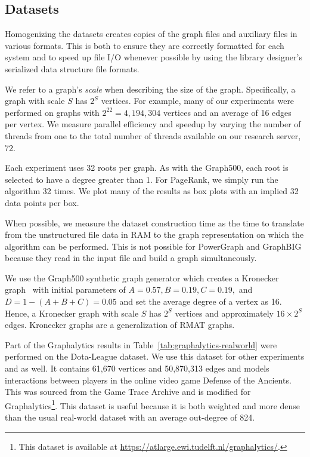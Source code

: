 \documentclass[conference]{IEEEtran}
\begin{document}
\subsection{Datasets}
Homogenizing the datasets creates copies of the graph files and auxiliary files in various formats. This is both to ensure they are correctly formatted for each system and to speed up file I/O whenever possible by using the library designer's serialized data structure file formats.

We refer to a graph's \emph{scale} when describing the size of the graph. Specifically, a graph with scale $S$ has $2^S$ vertices. For example, many of our experiments were performed on graphs with $2^{22} = 4,194,304$ vertices and an average of 16 edges per vertex. We measure parallel efficiency and speedup by varying the number of threads from one to the total number of threads available on our research server, 72.

Each experiment uses 32 roots per graph. As with the Graph500, each root is selected to have a degree greater than 1. For PageRank, we simply run the algorithm 32 times. We plot many of the results as box plots with an implied 32 data points per box.

When possible, we measure the dataset construction time as the time to translate from the unstructured file data in RAM to the graph representation on which the algorithm can be performed. This is not possible for PowerGraph and GraphBIG because they read in the input file and build a graph simultaneously.

We use the Graph500 synthetic graph generator which creates a Kronecker graph~\cite{Leskovec:2010:Kronecker} with initial parameters of $A = 0.57, B = 0.19, C = 0.19,$ and $D = 1-(A+B+C) = 0.05$ and set the average degree of a vertex as 16. Hence, a Kronecker graph with scale $S$ has $2^S$ vertices and approximately $16 \times 2^S$ edges. Kronecker graphs are a generalization of RMAT graphs.

Part of the Graphalytics results in Table~\ref{tab:graphalytics-realworld} were performed on the Dota-League dataset. We use this dataset for other experiments and as well. It contains 61,670 vertices and 50,870,313 edges and models interactions between players in the online video game Defense of the Ancients. This was sourced from the Game Trace Archive\cite{Guo:2012:GTA} and is modified for Graphalytics\footnote{This dataset is available at \url{https://atlarge.ewi.tudelft.nl/graphalytics/}.}. This dataset is useful because it is both weighted and more dense than the usual real-world dataset with an average out-degree of 824.
\end{document}
